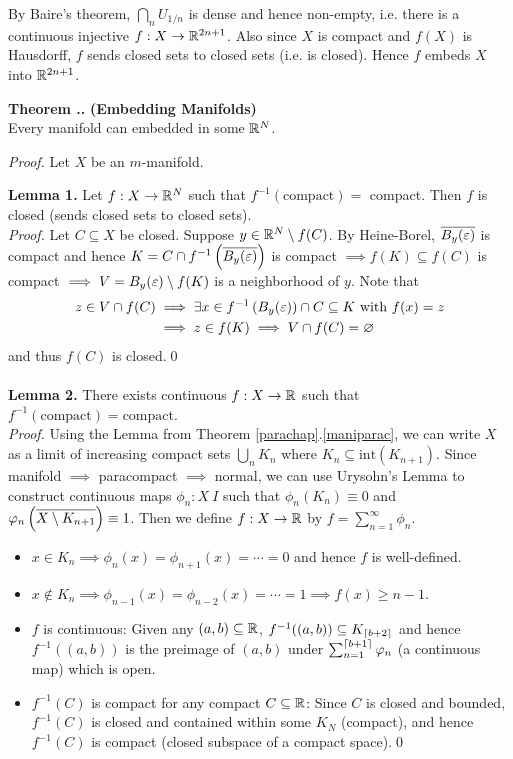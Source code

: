 \documentclass{natsirt}
\newcommand{\ol}{\overline}
\newcounter{def}[section]
\newcounter{thm}[section]
\newenvironment{thmbox}[1][]{
\begin{greenbox}[#1]\refstepcounter{thm}\textbf{Theorem \thesection.\thethm. }}{\end{greenbox}}
\begin{document}
By Baire's theorem, $\bigcap_n U_{1/n}$ is dense and hence non-empty, i.e. there is a continuous injective $f:X\rightarrow\mathbb{R}^{2n+1}$. Also since $X$ is compact and $f(X)$ is Hausdorff, $f$ sends closed sets to closed sets (i.e. is closed). Hence $f$ embeds $X$ into $\mathbb{R}^{2n+1}$.\QED

\begin{thmbox}
    \textbf{(Embedding Manifolds)}\\
    Every manifold can embedded in some $\mathbb{R}^N$.
\end{thmbox}
\textit{Proof.} Let $X$ be an $m$-manifold.
\begin{whitebox}
    \textbf{Lemma 1.} Let $f:X\rightarrow\mathbb{R}^N$ such that $f^{-1}(\text{compact})=$ compact. Then $f$ is closed (sends closed sets to closed sets).\vspace{0.4cm}\\
    \textit{Proof.} Let $C\subseteq X$ be closed. Suppose $y\in \mathbb{R}^N\setminus f(C)$. By Heine-Borel, $\ol{B_y(\eps)}$ is compact and hence $K=C\cap f^{-1}\pr{\ol{B_y(\eps)}}$ is compact $\implies f(K)\subseteq f(C)$ is compact $\implies V = B_y(\varepsilon) \setminus f(K)$ is a neighborhood of $y$. Note that
    \begin{align*}
        z\in V\cap f(C) &\implies \exists x \in f^{-1}\left( B_y(\varepsilon) \right)\cap C\subseteq K \text{ with } f(x) = z\\
        &\implies z \in f(K) \implies V\cap f(C) = \varnothing
    \end{align*}
    and thus $f(C)$ is closed.\qed \\ \\
    \textbf{Lemma 2.} There exists continuous $f:X\rightarrow \mathbb{R}$ such that $f^{-1}(\text{compact}) = \text{compact}$. \vspace{0.4cm}\\
    \textit{Proof.} Using the Lemma from Theorem \ref{parachap}.\ref{maniparac}, we can write $X$ as a limit of increasing compact sets $\bigcup_n K_n$ where $K_n \subseteq \text{int}(K_{n+1})$. Since manifold $\implies$ paracompact $\implies$ normal, we can use Urysohn's Lemma to construct continuous maps $\phi_n: X\> I$ such that $\phi_n(K_n) \equiv 0$ and $\phi_n\pr{\ol{X\setminus K_{n+1}}}\equiv 1$. Then we define $f:X\rightarrow\mathbb{R}$ by $f=\sum_{n=1}^\infty \phi_n$.
    \begin{itemize}
        \item $x\in K_n \implies \phi_n(x)=\phi_{n+1}(x)=\cdots=0$ and hence $f$ is well-defined. 
        \item $x\not \in K_n \implies \phi_{n-1}(x) = \phi_{n-2}(x) = \cdots = 1 \implies f(x) \geq n-1$.
        \item $f$ is continuous: Given any $(a,b)\subseteq \mathbb{R}$, $f^{-1}((a,b))\subseteq K_{\left\lceil b+2 \right\rceil}$ and hence $f^{-1}((a,b))$ is the preimage of $(a,b)$ under $\sum_{n=1}^{\left\lceil b+1 \right\rceil}\varphi_n$ (a continuous map) which is open.
        \item $f^{-1}(C)$ is compact for any compact $C\subseteq \mathbb{R}$: Since $C$ is closed and bounded, $f^{-1}(C)$ is closed and contained within some $K_N$ (compact), and hence $f^{-1}(C)$ is compact (closed subspace of a compact space).\qed 
    \end{itemize}
\end{whitebox}
\end{document}

